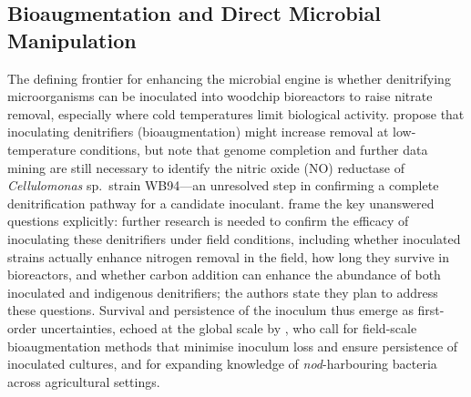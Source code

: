 \subsection{Bioaugmentation and Direct Microbial Manipulation}
The defining frontier for enhancing the microbial engine is whether denitrifying microorganisms can be inoculated into woodchip bioreactors to raise nitrate removal, especially where cold temperatures limit biological activity. \textcite{Jang2019} propose that inoculating denitrifiers (bioaugmentation) might increase removal at low-temperature conditions, but note that genome completion and further data mining are still necessary to identify the nitric oxide (NO) reductase of \emph{Cellulomonas} sp.\ strain WB94---an unresolved step in confirming a complete denitrification pathway for a candidate inoculant. \textcite{Anderson2020} frame the key unanswered questions explicitly: further research is needed to confirm the efficacy of inoculating these denitrifiers under field conditions, including whether inoculated strains actually enhance nitrogen removal in the field, how long they survive in bioreactors, and whether carbon addition can enhance the abundance of both inoculated and indigenous denitrifiers; the authors state they plan to address these questions. Survival and persistence of the inoculum thus emerge as first-order uncertainties, echoed at the global scale by \textcite{Wang2025b}, who call for field-scale bioaugmentation methods that minimise inoculum loss and ensure persistence of inoculated cultures, and for expanding knowledge of \emph{nod}-harbouring bacteria across agricultural settings.

